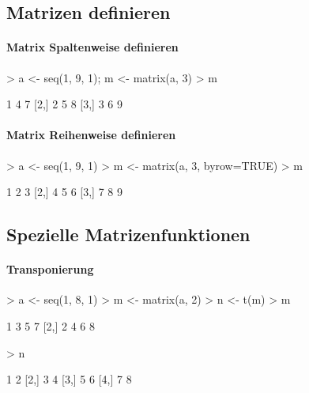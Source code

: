 \subsection{Matrizen definieren}

\paragraph{Matrix Spaltenweise definieren}
\begin{Schunk}
\begin{Sinput}
> a <- seq(1, 9, 1); m <- matrix(a, 3)
> m
\end{Sinput}
\begin{Soutput}
     [,1] [,2] [,3]
[1,]    1    4    7
[2,]    2    5    8
[3,]    3    6    9
\end{Soutput}
\end{Schunk}

\paragraph{Matrix Reihenweise definieren}
\begin{Schunk}
\begin{Sinput}
> a <- seq(1, 9, 1)
> m <- matrix(a, 3, byrow=TRUE)
> m
\end{Sinput}
\begin{Soutput}
     [,1] [,2] [,3]
[1,]    1    2    3
[2,]    4    5    6
[3,]    7    8    9
\end{Soutput}
\end{Schunk}

\subsection{Spezielle Matrizenfunktionen}

\paragraph{Transponierung}
\begin{Schunk}
\begin{Sinput}
> a <- seq(1, 8, 1)
> m <- matrix(a, 2)
> n <- t(m)
> m
\end{Sinput}
\begin{Soutput}
     [,1] [,2] [,3] [,4]
[1,]    1    3    5    7
[2,]    2    4    6    8
\end{Soutput}
\begin{Sinput}
> n
\end{Sinput}
\begin{Soutput}
     [,1] [,2]
[1,]    1    2
[2,]    3    4
[3,]    5    6
[4,]    7    8
\end{Soutput}
\end{Schunk}

